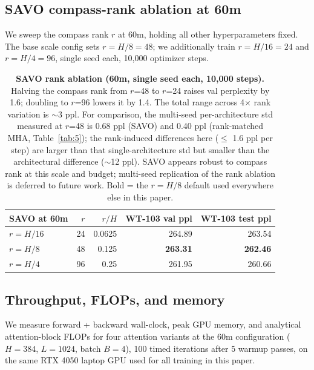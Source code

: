 \subsection{SAVO compass-rank ablation at 60m}\label{sec:5.8}

We sweep the compass rank $r$ at 60m, holding all other hyperparameters fixed. The base scale config
sets $r = H/8 = 48$; we additionally train $r = H/16 = 24$ and $r = H/4 = 96$, single seed each, 10,000
optimizer steps.

\begin{table}[H]
\centering
\small
\renewcommand{\arraystretch}{1.2}
\begin{tabular}{lrrrr}
\toprule
SAVO at 60m & $r$ & $r/H$ & WT-103 val ppl & WT-103 test ppl \\
\midrule
$r = H/16$ & 24 & 0.0625 & 264.89 & 263.54 \\
$r = H/8$ & 48 & 0.125 & \textbf{263.31} & \textbf{262.46} \\
$r = H/4$ & 96 & 0.25 & 261.95 & 260.66 \\
\bottomrule
\end{tabular}
\caption{\textbf{SAVO rank ablation (60m, single seed each, 10,000 steps).} Halving the compass rank from $r$=48 to
$r$=24 raises val perplexity by 1.6; doubling to $r$=96 lowers it by 1.4. The total range across 4$\times$ rank variation
is $\sim$3 ppl. For comparison, the multi-seed per-architecture std measured at $r$=48 is 0.68 ppl (SAVO) and 0.40
ppl (rank-matched MHA, Table~\ref{tab:5}); the rank-induced differences here ($\leq$ 1.6 ppl per step) are larger than that
single-architecture std but smaller than the architectural difference ($\sim$12 ppl). SAVO appears robust to compass
rank at this scale and budget; multi-seed replication of the rank ablation is deferred to future work. Bold = the
$r = H/8$ default used everywhere else in this paper.}
\label{tab:9}
\end{table}

\subsection{Throughput, FLOPs, and memory}\label{sec:5.9}

We measure forward + backward wall-clock, peak GPU memory, and analytical attention-block FLOPs
for four attention variants at the 60m configuration ($H = 384$, $L = 1024$, batch $B = 4$), 100 timed
iterations after 5 warmup passes, on the same RTX 4050 laptop GPU used for all training in this paper.

